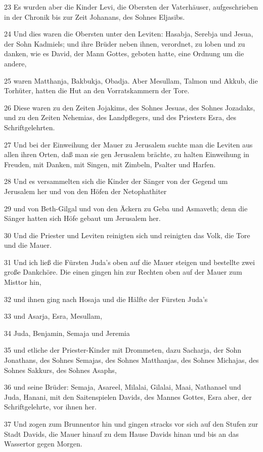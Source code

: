 \par 23 Es wurden aber die Kinder Levi, die Obersten der Vaterhäuser, aufgeschrieben in der Chronik bis zur Zeit Johanans, des Sohnes Eljasibs.
\par 24 Und dies waren die Obersten unter den Leviten: Hasabja, Serebja und Jesua, der Sohn Kadmiels; und ihre Brüder neben ihnen, verordnet, zu loben und zu danken, wie es David, der Mann Gottes, geboten hatte, eine Ordnung um die andere,
\par 25 waren Matthanja, Bakbukja, Obadja. Aber Mesullam, Talmon und Akkub, die Torhüter, hatten die Hut an den Vorratskammern der Tore.
\par 26 Diese waren zu den Zeiten Jojakims, des Sohnes Jesuas, des Sohnes Jozadaks, und zu den Zeiten Nehemias, des Landpflegers, und des Priesters Esra, des Schriftgelehrten.
\par 27 Und bei der Einweihung der Mauer zu Jerusalem suchte man die Leviten aus allen ihren Orten, daß man sie gen Jerusalem brächte, zu halten Einweihung in Freuden, mit Danken, mit Singen, mit Zimbeln, Psalter und Harfen.
\par 28 Und es versammelten sich die Kinder der Sänger von der Gegend um Jerusalem her und von den Höfen der Netophathiter
\par 29 und von Beth-Gilgal und von den Äckern zu Geba und Asmaveth; denn die Sänger hatten sich Höfe gebaut um Jerusalem her.
\par 30 Und die Priester und Leviten reinigten sich und reinigten das Volk, die Tore und die Mauer.
\par 31 Und ich ließ die Fürsten Juda's oben auf die Mauer steigen und bestellte zwei große Dankchöre. Die einen gingen hin zur Rechten oben auf der Mauer zum Misttor hin,
\par 32 und ihnen ging nach Hosaja und die Hälfte der Fürsten Juda's
\par 33 und Asarja, Esra, Mesullam,
\par 34 Juda, Benjamin, Semaja und Jeremia
\par 35 und etliche der Priester-Kinder mit Drommeten, dazu Sacharja, der Sohn Jonathans, des Sohnes Semajas, des Sohnes Matthanjas, des Sohnes Michajas, des Sohnes Sakkurs, des Sohnes Asaphs,
\par 36 und seine Brüder: Semaja, Asareel, Milalai, Gilalai, Maai, Nathanael und Juda, Hanani, mit den Saitenspielen Davids, des Mannes Gottes, Esra aber, der Schriftgelehrte, vor ihnen her.
\par 37 Und zogen zum Brunnentor hin und gingen stracks vor sich auf den Stufen zur Stadt Davids, die Mauer hinauf zu dem Hause Davids hinan und bis an das Wassertor gegen Morgen.
